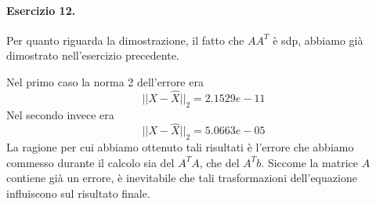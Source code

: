 \paragraph{Esercizio 12.} Per quanto riguarda la dimostrazione, il fatto che $AA^T$ è sdp, abbiamo già dimostrato nell'esercizio precedente.

Nel primo caso la norma 2 dell'errore era \[||X - \hat{X}||_2 = 2.1529e-11\] Nel secondo invece era \[||X - \hat{X}||_2 = 5.0663e-05\]La ragione per cui abbiamo ottenuto tali risultati è l'errore che abbiamo commesso durante il calcolo sia del $A^TA$, che del $A^Tb$. Siccome la matrice $A$ contiene già un errore, è inevitabile che tali trasformazioni dell'equazione influiscono sul risultato finale.